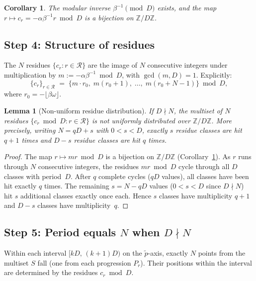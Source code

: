 \documentclass[11pt]{article}
\theoremstyle{plain}
\newtheorem{lemma}[theorem]{Lemma}
\newtheorem{corollary}[theorem]{Corollary}
\theoremstyle{definition}
\theoremstyle{remark}
\begin{document}
\begin{corollary}\label{cor:inverse}
The modular inverse $\beta^{-1} \pmod{D}$ exists, and the map
$r \mapsto c_r = -\alpha\beta^{-1}r \bmod D$ is a bijection on
$\mathbb{Z}/D\mathbb{Z}$.
\end{corollary}

\subsection{Step 4: Structure of residues}\label{subsec:step4}

The $N$ residues $\{c_r : r \in \mathcal{R}\}$ are the image of $N$
consecutive integers under multiplication by $m := -\alpha\beta^{-1} \bmod D$,
with $\gcd(m, D) = 1$.  Explicitly:
\begin{equation}\label{eq:residues}
    \{c_r\}_{r \in \mathcal{R}} \;=\;
    \{m \cdot r_0,\; m(r_0+1),\; \ldots,\; m(r_0+N-1)\} \bmod D,
\end{equation}
where $r_0 = -\lfloor\beta\omega\rfloor$.

\begin{lemma}[Non-uniform residue distribution]\label{lem:nonuniform}
If $D \nmid N$, the multiset of $N$ residues
$\{c_r \bmod D : r \in \mathcal{R}\}$ is not uniformly distributed over
$\mathbb{Z}/D\mathbb{Z}$.  More precisely, writing $N = qD + s$ with
$0 < s < D$, exactly $s$ residue classes are hit $q+1$ times and $D - s$
residue classes are hit $q$ times.
\end{lemma}
\begin{proof}
The map $r \mapsto mr \bmod D$ is a bijection on $\mathbb{Z}/D\mathbb{Z}$
(Corollary~\ref{cor:inverse}).
As $r$ runs through $N$ consecutive integers, the residues $mr \bmod D$
cycle through all $D$ classes with period~$D$.
After $q$ complete cycles ($qD$ values), all classes have been hit exactly
$q$ times.  The remaining $s = N - qD$ values ($0 < s < D$ since
$D \nmid N$) hit $s$ additional classes exactly once each.
Hence $s$ classes have multiplicity $q + 1$ and $D - s$ classes have
multiplicity~$q$.
\end{proof}

\subsection{Step 5: Period equals $N$ when $D \nmid N$}\label{subsec:step5}

Within each interval $[kD,\, (k+1)D)$ on the $\tilde{p}$-axis, exactly $N$
points from the multiset $S$ fall (one from each progression $P_r$).
Their positions within the interval are determined by the residues
$c_r \bmod D$.
\end{document}
